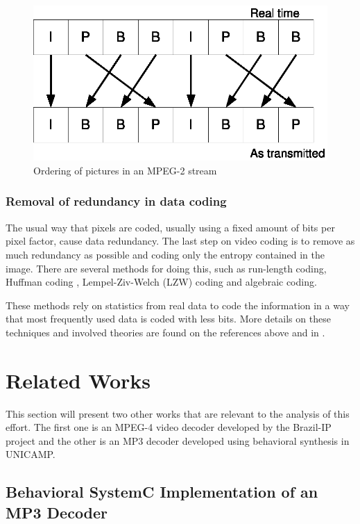\documentclass[a4paper, 12pt]{article}
\begin{document}
\begin{figure}[h]
\centering
\includegraphics{figs/reorder.eps}
\caption{Ordering of pictures in an MPEG-2 stream}
\label{fig:reorder}
\end{figure}

\subsubsection{Removal of redundancy in data coding}

	The usual way that pixels are coded, usually using a fixed amount of bits per pixel factor, cause data redundancy. The last step on video coding is to remove as much redundancy as possible and coding only the entropy contained in the image. There are several methods for doing this, such as run-length coding, Huffman coding \cite{huffman}, Lempel-Ziv-Welch (LZW) coding\cite{lzw} and algebraic coding.

	These methods rely on statistics from real data to code the information in a way that most frequently used data is coded with less bits. More details on these techniques and involved theories are found on the references above and in .

\pagebreak

\section{Related Works}


This section will present two other works that are relevant to the analysis of this effort. The first one is an MPEG-4 video decoder developed by the Brazil-IP project and the other is an MP3 decoder developed using behavioral synthesis in UNICAMP.

\subsection{Behavioral SystemC Implementation of an MP3 Decoder}
\end{document}
